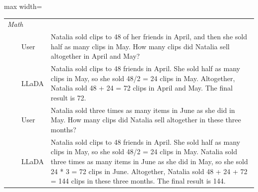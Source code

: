 \documentclass{article}
\begin{document}
\begin{table}[t!]
\begin{minipage}{0.99\textwidth}
{\begin{adjustbox}{max width=\textwidth}
\begin{tabular}{l p{12.5cm} }
\midrule
\emph{Math} \\
~~~~User & Natalia sold clips to 48 of her friends in April, and then she sold half as many clips in May. How many clips did Natalia sell altogether in April and May? \\
~~~~LLaDA & Natalia sold clips to 48 friends in April. She sold half as many clips in May, so she sold 48/2 = 24 clips in May. Altogether, Natalia sold 48 + 24 = 72 clips in April and May. The final result is 72. \\ 
~~~~User & Natalia sold three times as many items in June as she did in May. How many clips did Natalia sell altogether in these three months? \\
~~~~LLaDA & Natalia sold clips to 48 friends in April. She sold half as many clips in May, so she sold 48/2 = 24 clips in May. Natalia sold three times as many items in June as she did in May, so she sold 24 * 3 = 72 clips in June. Altogether, Natalia sold 48 + 24 + 72 = 144 clips in these three months. The final result is 144. \\
\bottomrule
\end{tabular}
\end{adjustbox}
}

\end{minipage}
\end{table}
\end{document}
